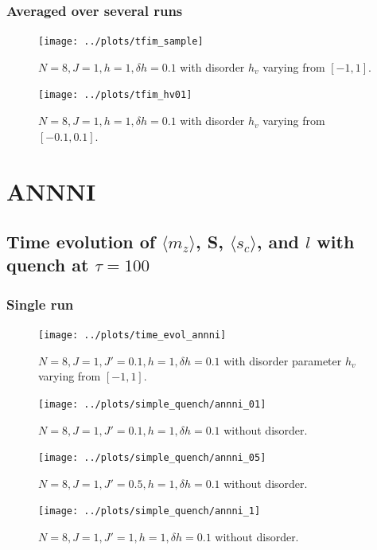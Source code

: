 \documentclass[a4paper]{article}
\begin{document}
\newpage
\subsubsection{Averaged over several runs}
\begin{figure}[h]
  \centering
  \texttt{[image: ../plots/tfim\_sample]}
  \caption{$N = 8, J = 1, h = 1, \delta h = 0.1$ with disorder $h_v$ varying from $[-1,1]$.}
  \label{fig:TFIM}
\end{figure}

\begin{figure}[h]
  \centering
  \texttt{[image: ../plots/tfim\_hv01]}
  \caption{$N = 8, J = 1, h = 1, \delta h = 0.1$ with disorder $h_v$ varying from $[-0.1,0.1]$.}
  \label{fig:}
\end{figure}

\newpage
\section{ANNNI}
\subsection{Time evolution of $\langle m_z \rangle$, S, $\langle s_c \rangle$, and $l$ with quench at $\tau=100$}
\subsubsection{Single run}
\begin{figure}[h]
  \centering
  \texttt{[image: ../plots/time\_evol\_annni]}
  \caption{$N=8, J=1, J'=0.1, h=1, \delta h=0.1$ with disorder parameter $h_v$ varying from $[-1,1]$.}
\end{figure}

\begin{figure}
  \centering
  \texttt{[image: ../plots/simple\_quench/annni\_01]}
  \caption{$N = 8, J = 1, J'=0.1, h = 1, \delta h = 0.1$ without disorder.}
  \label{fig:}
\end{figure}

\begin{figure}
  \centering
  \texttt{[image: ../plots/simple\_quench/annni\_05]}
  \caption{$N = 8, J = 1, J'=0.5, h = 1, \delta h = 0.1$ without disorder.}
  \label{fig:}
\end{figure}

\begin{figure}
  \centering
  \texttt{[image: ../plots/simple\_quench/annni\_1]}
  \caption{$N = 8, J = 1, J'=1, h = 1, \delta h = 0.1$ without disorder.}
  \label{fig:}
\end{figure}
\end{document}

